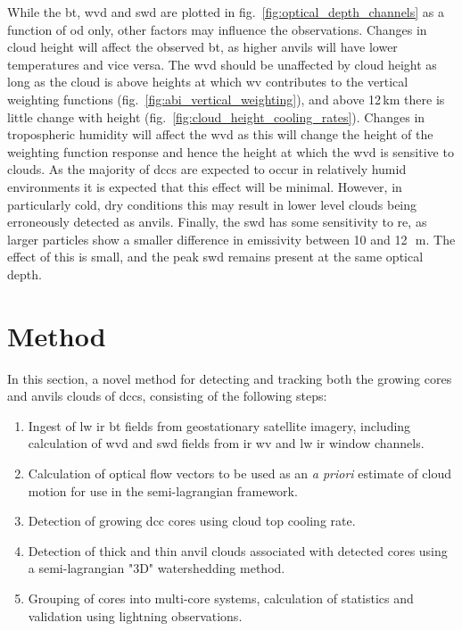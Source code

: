 While the \acrshort{bt}, \acrshort{wvd} and \acrshort{swd} are plotted in fig.~\ref{fig:optical_depth_channels} as a function of \acrshort{od} only, other factors may influence the observations.
Changes in cloud height will affect the observed \acrshort{bt}, as higher anvils will have lower temperatures and vice versa.
The \acrshort{wvd} should be unaffected by cloud height as long as the cloud is above heights at which \acrshort{wv} contributes to the vertical weighting functions (fig.~\ref{fig:abi_vertical_weighting}), and above 12\,km there is little change with height (fig.~\ref{fig:cloud_height_cooling_rates}). 
Changes in tropospheric humidity will affect the \acrshort{wvd} as this will change the height of the weighting function response and hence the height at which the \acrshort{wvd} is sensitive to clouds.
As the majority of \acrshort{dcc}s are expected to occur in relatively humid environments it is expected that this effect will be minimal.
However, in particularly cold, dry conditions this may result in lower level clouds being erroneously detected as anvils.
Finally, the \acrshort{swd} has some sensitivity to \acrshort{re}, as larger particles show a smaller difference in emissivity between 10 and 12\,\unit{\mu m}.
The effect of this is small, and the peak \acrshort{swd} remains present at the same optical depth.


\section{Method} \label{sec:tracking_method}

In this section, a novel method for detecting and tracking both the growing cores and anvils clouds of \acrshort{dcc}s, consisting of the following steps:

\begin{enumerate}
    \item Ingest of \acrshort{lw} \acrshort{ir} \acrshort{bt} fields from geostationary satellite imagery, including calculation of \acrshort{wvd} and \acrshort{swd} fields from \acrshort{ir} \acrshort{wv} and \acrshort{lw} \acrshort{ir} window channels.
    \item Calculation of optical flow vectors to be used as an \textit{a priori} estimate of cloud motion for use in the semi-lagrangian framework.
    \item Detection of growing \acrshort{dcc} cores using cloud top cooling rate.
    \item Detection of thick and thin anvil clouds associated with detected cores using a semi-lagrangian "3D" watershedding method. 
    \item Grouping of cores into multi-core systems, calculation of statistics and validation using lightning observations.
\end{enumerate}



